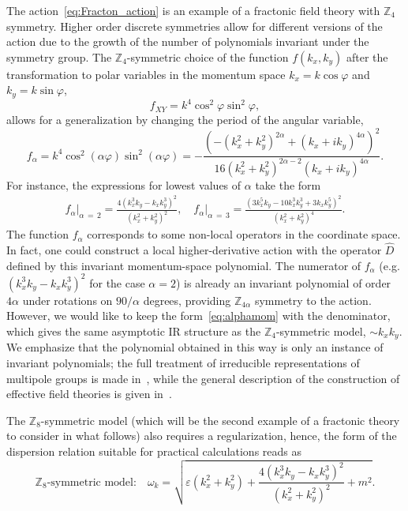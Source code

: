 \documentclass[a4paper,12pt]{article}
\newcommand{\be}{\begin{equation}}
\newcommand{\ee}{\end{equation}}
\newcommand{\eps}{\varepsilon}
\newcommand{\Z}[1]{\mathbb{Z}_{#1}}
\begin{document}
The action~\eqref{eq:Fracton_action} is an example of a fractonic field theory with $\Z4$ symmetry. Higher order discrete symmetries allow for different versions of the action due to the growth of the number of polynomials invariant under the symmetry group. The $\Z4$-symmetric choice of the function $f(k_x, k_y)$ after the transformation to polar variables in the momentum space $k_x = k\cos\varphi$ and $k_y = k\sin\varphi$,
\be 
    f_{XY} = k^4 \cos^2\varphi \sin^2\varphi,
\ee 
allows for a generalization by changing the period of the angular variable,
\be
    f_\alpha = k^4 \cos^2(\alpha\varphi) \sin^2(\alpha\varphi) = -\frac{\left(-\left(k_x^2 + k_y^2\right)^{2\alpha} + \left(k_x + i k_y\right)^{4\alpha}\right)^2}{16\left(k_x^2 + k_y^2\right)^{2\alpha - 2}\left(k_x + i k_y\right)^{4\alpha}}.
    \label{eq:alphamom}
\ee
For instance, the expressions for lowest values of $\alpha$ take the form
\begin{gather} 
    f_\alpha\Big\rvert_{\alpha\,=\,2} = \frac{4\left(k_x^3 k_y - k_x k_y^3\right)^2}{\left(k_x^2 + k_y^2\right)^2}, \quad f_\alpha\Big\rvert_{\alpha\,=\,3} = \frac{\left(3 k_x^5 k_y - 10 k_x^3 k_y^3 + 3 k_x k_y^5\right)^2}{\left(k_x^2 + k_y^2\right)^4}.
\end{gather}
The function $f_\alpha$ corresponds to some non-local operators in the coordinate space. In fact, one could construct a local higher-derivative action with the operator $\hat{D}$ defined by this invariant momentum-space polynomial. The numerator of $f_\alpha$ (e.g. $(k_x^3 k_y - k_x k_y^3)^2$ for the case $\alpha = 2$) is already an invariant polynomial of order $4\alpha$ under rotations on $90/\alpha$ degrees, providing $\Z{4\alpha}$ symmetry to the action. However, we would like to keep the form~\eqref{eq:alphamom} with the denominator, which gives the same asymptotic IR structure as the $\Z4$-symmetric model, $\sim k_xk_y$. We emphasize that the polynomial obtained in this way is only an instance of invariant polynomials; the full treatment of irreducible representations of multipole groups is made in~\cite{Bulmash:2023msp}, while the general description of the construction of effective field theories is given in~\cite{Gromov2019towards}.

The $\Z8$-symmetric model (which will be the second example of a fractonic theory to consider in what follows) also requires a regularization, hence, the form of the dispersion relation suitable for practical calculations reads as
\be
    \Z8\text{-symmetric model:} \quad \omega_k = \sqrt{\eps(k_x^2 + k_y^2) + \frac{4(k_x^3 k_y - k_x k_y^3)^2}{(k_x^2 + k_y^2)^2} + m^2}.
    \label{eq:Z8disprel}
\ee
\end{document}
